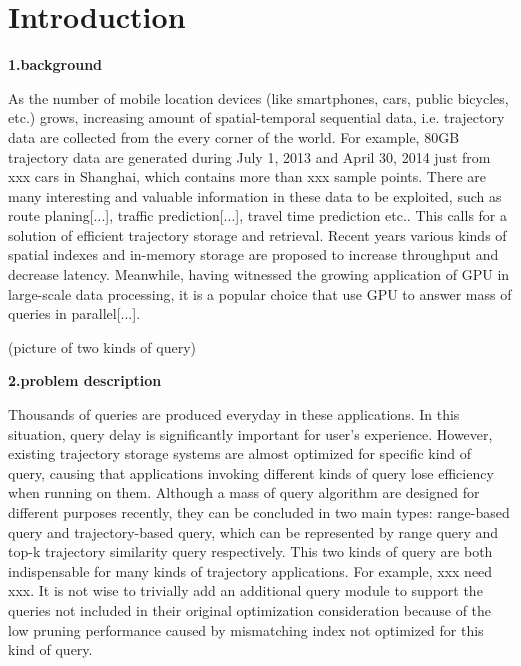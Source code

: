\documentclass[conference]{IEEEtran}
\begin{document}
\section{Introduction}
\textbf{1.background}
	
	As the number of mobile location devices (like smartphones, cars, public bicycles, etc.) grows, increasing amount of spatial-temporal sequential data, i.e. trajectory data are collected from the every corner of the world. For example, 80GB trajectory data are generated during July 1, 2013 and April 30, 2014 just from xxx cars in Shanghai, which contains more than xxx sample points. There are many interesting and valuable information in these data to be exploited, such as route planing[...], traffic prediction[...], travel time prediction\cite{DBLP:conf/gis/LeeSCC12} etc..  This calls for a solution of efficient trajectory storage and retrieval. Recent years various kinds of spatial indexes and in-memory storage are proposed to increase throughput and decrease latency. Meanwhile, having witnessed the growing application of GPU in large-scale data processing, it is a popular choice that use GPU to answer mass of queries in parallel\cite{7498315}[...]. 
	
	(picture of two kinds of query)
	
	
\textbf{2.problem description}

	Thousands of queries are produced everyday in these applications. In this situation, query delay is significantly important for user's experience. However, existing trajectory storage systems are almost optimized for specific kind of query, causing that applications invoking different kinds of query lose efficiency when running on them. Although a mass of query algorithm are designed for different purposes recently, they can be concluded in two main types: range-based query and trajectory-based query, which can be represented by range query and top-k trajectory similarity query respectively.\cite{DBLP:journals/tist/Zheng15} This two kinds of query are both indispensable for many kinds of trajectory applications. For example, xxx need xxx. It is not wise to trivially add an additional query module to support the queries not included in their original optimization consideration because of the low pruning performance caused by mismatching index not optimized for this kind of query.
	
\end{document}

